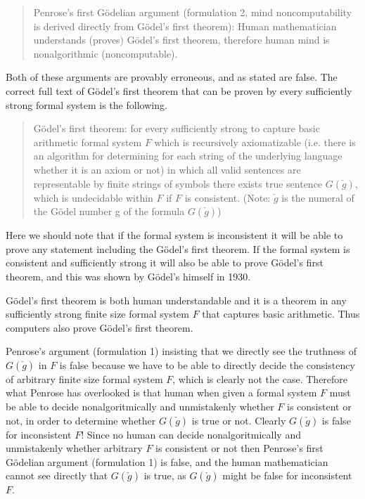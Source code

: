 \documentclass[12pt]{article}
\begin{document}
\begin{verse}Penrose's first G\"odelian argument (formulation 2, mind noncomputability is derived directly from G\"odel's first theorem): Human mathematician understands (proves) G\"odel's first theorem, therefore human mind is nonalgorithmic (noncomputable).
\end{verse}

Both of these arguments are provably erroneous, and as stated are false. The correct full text of G\"odel's first theorem that can be proven by every sufficiently strong formal system is the following.

\begin{verse}
G\"odel's first theorem: for every sufficiently strong to capture basic
arithmetic formal system $F$ which is recursively axiomatizable (i.e. there is an algorithm for determining for each string of the underlying language whether it is an axiom or not) in
which all valid sentences are representable by finite strings of symbols
there exists true sentence $G(\check{g})$, which is undecidable within
$F$ if $F$ is consistent. (Note: $\check{g}$ is the numeral of the G\"odel number g of the formula $G(\check{g})$)
\end{verse}

Here we should note that if the formal system is inconsistent it will be able to prove any statement including the G\"odel's first theorem. If the formal system is consistent and sufficiently strong it will also be able to prove G\"odel's first theorem, and this was shown by G\"odel's himself in 1930.

G\"odel's first theorem is both human understandable and
it is a theorem in any sufficiently strong finite size formal system
$F$ that captures basic arithmetic. Thus computers also prove G\"odel's
first theorem. 

Penrose's argument (formulation 1) insisting that we
directly see the truthness of $G(\check{g})$ in $F$ is false because we
have to be able to directly decide the consistency of arbitrary finite
size formal system $F$, which is clearly not the case. 
Therefore what Penrose has overlooked is that human when given a formal system $F$ must be able to decide nonalgoritmically and unmistakenly whether $F$ is consistent or not, in order to determine whether $G(\check{g})$ is true or not. Clearly $G(\check{g})$ is false for inconsistent $F$! Since no human can decide nonalgoritmically and unmistakenly whether arbitrary $F$ is consistent or not then Penrose's first G\"odelian argument (formulation 1) is false, and the human mathematician cannot see directly that $G(\check{g})$ is true, as $G(\check{g})$ might be false for inconsistent $F$. 
\end{document}
